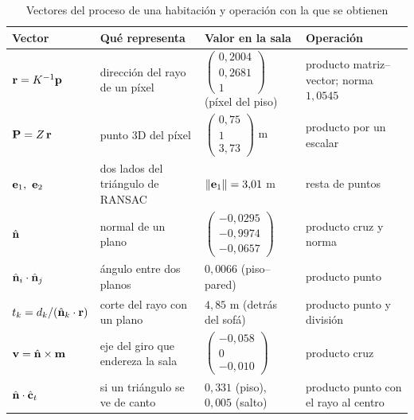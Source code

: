 \begin{table}[htbp]
\caption{Vectores del proceso de una habitación y operación con la que se obtienen}
\label{tab:vec-hab}
\centering\small
\begin{tabular}{@{}p{2.5cm}p{4.0cm}p{3.1cm}p{4.2cm}@{}}
\toprule
Vector & Qué representa & Valor en la sala & Operación \\
\midrule
$\mathbf{r}=K^{-1}\mathbf{p}$ & dirección del rayo de un píxel & $\begin{pmatrix} 0{,}2004 \\ 0{,}2681 \\ 1 \end{pmatrix}$ (píxel del piso) & producto matriz--vector; norma $1{,}0545$ \\
$\mathbf{P}=Z\,\mathbf{r}$ & punto 3D del píxel & $\begin{pmatrix} 0{,}75 \\ 1 \\ 3{,}73 \end{pmatrix}$ m & producto por un escalar \\
$\vect{e}_1,\ \vect{e}_2$ & dos lados del triángulo de RANSAC & $\lVert\mathbf{e}_1\rVert=3{,}01$ m & resta de puntos \\
$\hat{\mathbf{n}}$ & normal de un plano & $\begin{pmatrix} -0{,}0295 \\ -0{,}9974 \\ -0{,}0657 \end{pmatrix}$ & producto cruz y norma \\
$\hat{\mathbf{n}}_i\cdot\hat{\mathbf{n}}_j$ & ángulo entre dos planos & $0{,}0066$ (piso--pared) & producto punto \\
$t_k=d_k/(\hat{\mathbf{n}}_k\cdot\mathbf{r})$ & corte del rayo con un plano & $4{,}85$ m (detrás del sofá) & producto punto y división \\
$\mathbf{v}=\hat{\mathbf{n}}\times\mathbf{m}$ & eje del giro que endereza la sala & $\begin{pmatrix} -0{,}058 \\ 0 \\ -0{,}010 \end{pmatrix}$ & producto cruz \\
$\hat{\mathbf{n}}\cdot\hat{\mathbf{c}}_t$ & si un triángulo se ve de canto & $0{,}331$ (piso), $0{,}005$ (salto) & producto punto con el rayo al centro \\
\bottomrule
\end{tabular}
\end{table}
